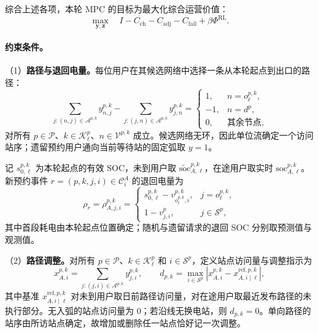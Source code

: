 \documentclass[12pt,a4paper,UTF8]{ctexart}
\begin{document}
综合上述各项，本轮 MPC 的目标为最大化综合运营价值：
\begin{equation}
\max_{\mathbf y,\mathbf z}\quad
I-C_{\mathrm{ch}}-C_{\mathrm{adj}}-C_{\mathrm{fail}}
+\beta\Phi^{\mathrm{RL}}.
\label{eq:objective}
\end{equation}

\paragraph{约束条件。}
（1）\textbf{路径与退回电量。}每位用户在其候选网络中选择一条从本轮起点到出口的路径：
\begin{equation}
\sum_{j:(n,j)\in\mathcal A^{p,k}}y_{n,j}^{p,k}
-\sum_{j:(j,n)\in\mathcal A^{p,k}}y_{j,n}^{p,k}
=\begin{cases}
1,&n=o_\ell^{p,k},\\
-1,&n=d^p,\\
0,&\text{其余节点},
\end{cases}
\label{eq:flow}
\end{equation}
对所有 $p\in\mathcal P$、$k\in\mathcal K_\ell^p$、$n\in\mathcal V^{p,k}$ 成立。候选网络无环，因此单位流确定一个访问站序；遗留预约用户通向当前等待站的固定弧取 $y=1$。

记 $s_{0,\ell}^{p,k}$ 为本轮起点的有效 SOC，未到用户取 $\widetilde{\mathrm{soc}}_{A,\ell}^{p,k}$，在途用户取实时 $\mathrm{soc}_{A,\ell}^{p,k}$。新预约事件 $r=(p,k,j,i)\in\mathcal C_i^A$ 的退回电量为
\begin{equation}
\rho_r=\rho_{A,j,i}^{p,k}
=\begin{cases}
s_{0,\ell}^{p,k}-v_{o_\ell^{p,k},i}^{p,k},&j=o_\ell^{p,k},\\
1-v_{j,i}^{p},&j\in\mathcal S^p,
\end{cases}
\label{eq:return_soc}
\end{equation}
其中首段耗电由本轮起点位置确定；随机与遗留请求的退回 SOC 分别取预测值与观测值。

（2）\textbf{路径调整。}对所有 $p\in\mathcal P$、$k\in\mathcal K_\ell^p$ 和 $i\in\mathcal S^p$，定义站点访问量与调整指示为
\begin{equation}
x_{A,i}^{p,k}=\sum_{j:(j,i)\in\mathcal A^{p,k}}y_{j,i}^{p,k},
\qquad
d_{p,k}=\max_{i\in\mathcal S^p}
\left|x_{A,i}^{p,k}-x_{A,i\mid\ell}^{\mathrm{ref},p,k}\right|,
\label{eq:path_adjustment_indicator}
\end{equation}
其中基准 $x_{A,i\mid\ell}^{\mathrm{ref},p,k}$ 对未到用户取日前路径访问量，对在途用户取最近发布路径的未执行部分。无入弧的站点访问量为 $0$；若沿线无换电站，则 $d_{p,k}=0$。单向路径的站序由所访站点确定，故增加或删除任一站点恰好记一次调整。
\end{document}
